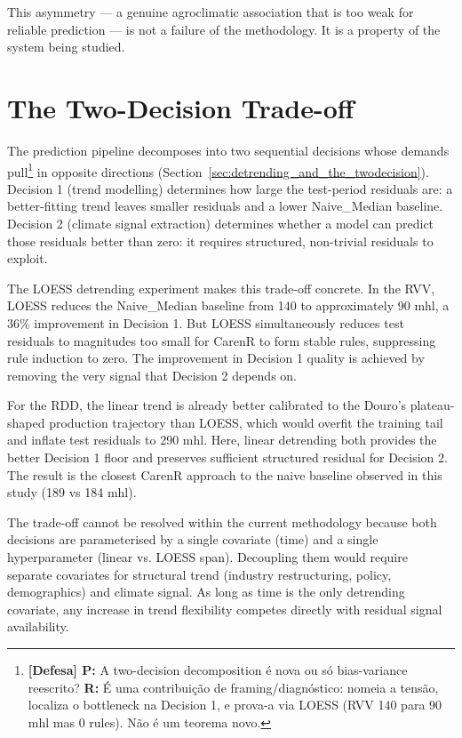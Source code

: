 This asymmetry --- a genuine agroclimatic association that is too weak for reliable prediction --- is not a failure of the methodology. It is a property of the system being studied.


\section{The Two-Decision Trade-off}\label{sec:the_twodecision_tradeoff}

The prediction pipeline decomposes into two sequential decisions whose demands pull\footnote{\textbf{[Defesa] P:} A two-decision decomposition é nova ou só bias-variance reescrito? \textbf{R:} É uma contribuição de framing/diagnóstico: nomeia a tensão, localiza o bottleneck na Decision 1, e prova-a via LOESS (RVV 140 para 90 mhl mas 0 rules). Não é um teorema novo.} in opposite directions (Section~\ref{sec:detrending_and_the_twodecision}). Decision 1 (trend modelling) determines how large the test-period residuals are: a better-fitting trend leaves smaller residuals and a lower Naive\_Median baseline. Decision 2 (climate signal extraction) determines whether a model can predict those residuals better than zero: it requires structured, non-trivial residuals to exploit.

The LOESS detrending experiment makes this trade-off concrete. In the RVV, LOESS reduces the Naive\_Median baseline from 140 to approximately 90 mhl, a 36\% improvement in Decision 1. But LOESS simultaneously reduces test residuals to magnitudes too small for CarenR to form stable rules, suppressing rule induction to zero. The improvement in Decision 1 quality is achieved by removing the very signal that Decision 2 depends on.

For the RDD, the linear trend is already better calibrated to the Douro's plateau-shaped production trajectory than LOESS, which would overfit the training tail and inflate test residuals to 290 mhl. Here, linear detrending both provides the better Decision 1 floor and preserves sufficient structured residual for Decision 2. The result is the closest CarenR approach to the naive baseline observed in this study (189 vs 184 mhl).

The trade-off cannot be resolved within the current methodology because both decisions are parameterised by a single covariate (time) and a single hyperparameter (linear vs. LOESS span). Decoupling them would require separate covariates for structural trend (industry restructuring, policy, demographics) and climate signal. As long as time is the only detrending covariate, any increase in trend flexibility competes directly with residual signal availability.


